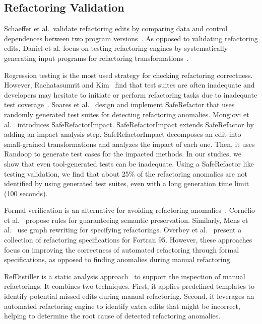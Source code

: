 \subsection{Refactoring Validation} 
\label{sec:refactoringvalidation} 

Schaeffer et al.~validate refactoring edits by comparing data and control dependences between two program versions~\cite{Schaefer2010:refactoring}. As opposed to validating refactoring edits, Daniel et al. focus on testing refactoring engines by systematically generating input programs for refactoring transformations~\cite{Brett2007:reftest}. 

Regression testing is the most used strategy for checking refactoring correctness. However, Rachatasumrit and Kim~\cite{Rachatasumrit2012:refactortest} find that test suites are often inadequate and developers may hesitate to initiate or perform refactoring tasks due to inadequate test coverage~\cite{Kim2012:FSR}. Soares et al.~\cite{Soares:icse10} design and implement SafeRefactor that uses randomly generated test suites for detecting refactoring anomalies. Mongiovi et al.~\cite{mongiovi2013making} introduces SafeRefactorImpact. SafeRefactorImpact extends SafeRefactor by adding an impact analysis step. SafeRefactorImpact decomposes an edit into small-grained transformations and analyzes the impact of each one. Then, it uses Randoop to generate test cases for the impacted methods. In our studies, we show that even tool-generated tests can be inadequate. Using a SafeRefactor like testing validation, we find that about 25\% of the refactoring anomalies are not identified by using generated test suites, even with a long generation time limit (100 seconds). 

Formal verification is an alternative for avoiding refactoring anomalies~\cite{Mens2004:SSR}. Corn\'elio et al.~\cite{cornelio2010sound} propose rules for guaranteeing semantic preservation. Similarly, Mens et al.~\cite{mens2005formalizing} use graph rewriting for specifying refactorings. Overbey et al.~\cite{overbey2010collection} present a collection of refactoring specifications for Fortran 95. However, these approaches focus on improving the correctness of automated refactoring through formal specifications, as opposed to finding anomalies during manual refactoring. 


RefDistiller is a static analysis approach~\cite{Alves2017:refdistiller,Alves:2014:RRA:2635868.2661674} to support the inspection of manual refactorings. It combines two techniques. First, it applies predefined templates to identify potential missed edits during manual refactoring. Second, it leverages an automated refactoring engine to identify extra edits that might be incorrect, helping to  determine the root cause of detected refactoring anomalies.

